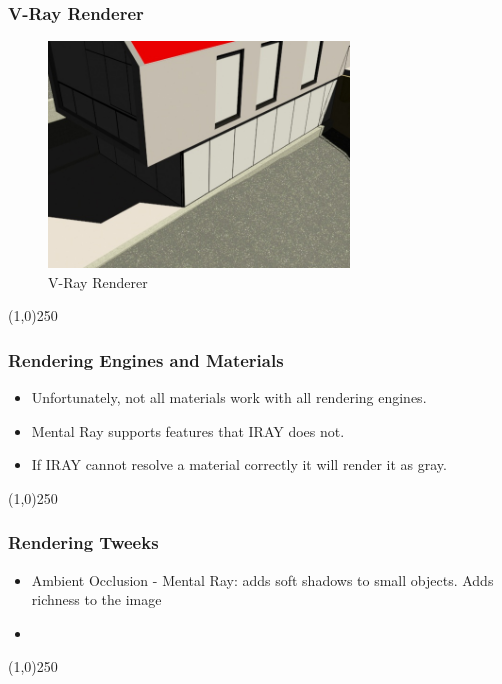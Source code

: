 \begin{frame}
\frametitle{V-Ray Renderer}
\begin{figure}
	\centering
	\includegraphics[height=6cm]{img/RenderEngine/Revit3DSScanLine.jpg}
	\caption{V-Ray Renderer}
	\label{fig:V-RayRenderer}
\end{figure}
\end{frame}
\begin{center}\line(1,0){250}\end{center}




\begin{frame}
\frametitle{Rendering Engines and Materials}
\begin{itemize}
	\item Unfortunately, not all materials work with all rendering engines.
	\item Mental Ray supports features that IRAY does not.
	\item If IRAY cannot resolve a material correctly it will render it as gray.
\end{itemize}
\end{frame}
\begin{center}\line(1,0){250}\end{center}


\begin{frame}
\frametitle{Rendering Tweeks}
\begin{itemize}
	\item Ambient Occlusion - Mental Ray: adds soft shadows to small objects.  Adds richness to the image
	\item 
\end{itemize}
\end{frame}
\begin{center}\line(1,0){250}\end{center}





